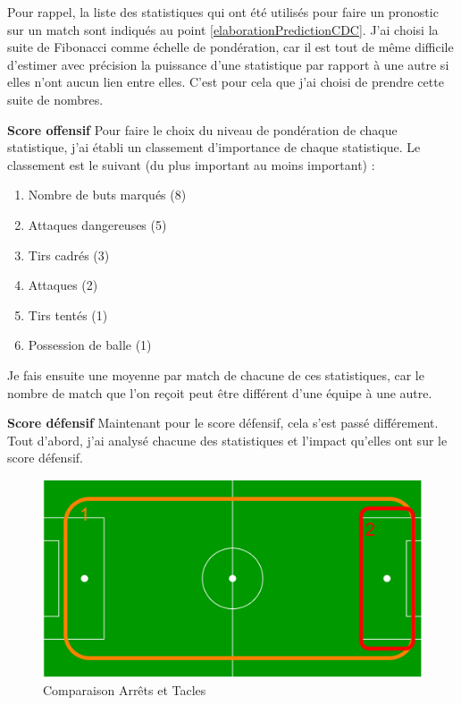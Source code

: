 \documentclass[a4paper,14pt]{extarticle}
\begin{document}
{Pour rappel, la liste des statistiques qui ont été utilisés pour faire un pronostic sur un match sont indiqués au point \ref{elaborationPredictionCDC}. J'ai choisi la suite de Fibonacci comme échelle de pondération, car il est tout de même difficile d'estimer avec précision la puissance d'une statistique par rapport à une autre si elles n'ont aucun lien entre elles. C'est pour cela que j'ai choisi de prendre cette suite de nombres.

\noindent\textbf{Score offensif}
Pour faire le choix du niveau de pondération de chaque statistique, j'ai établi un classement d'importance de chaque statistique. Le classement est le suivant (du plus important au moins important) :
\begin{enumerate}
    \item Nombre de buts marqués (8)
    \item Attaques dangereuses (5)
    \item Tirs cadrés (3)
    \item Attaques (2)
    \item Tirs tentés (1)
    \item Possession de balle (1)
\end{enumerate}
Je fais ensuite une moyenne par match de chacune de ces statistiques, car le nombre de match que l'on reçoit peut être différent d'une équipe à une autre.

\noindent\textbf{Score défensif}
Maintenant pour le score défensif, cela s'est passé différement. Tout d'abord, j'ai analysé chacune des statistiques et l'impact qu'elles ont sur le score défensif.

\begin{figure}[H]
    \centering
    \includegraphics[width=12cm]{../img/schemaPonderationDef.png}
    \caption{Comparaison Arrêts et Tacles}
    \label{fig:comparaisonArretsTacles}
\end{figure}

}
\end{document}
